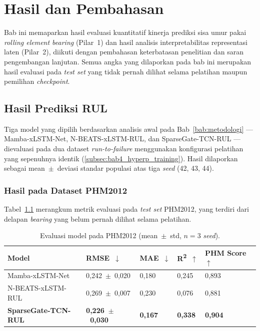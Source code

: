 ﻿%

\chapter{Hasil dan Pembahasan}
\label{bab:hasil-pembahasan}

Bab ini memaparkan hasil evaluasi kuantitatif kinerja prediksi sisa umur
pakai \emph{rolling element bearing} (Pilar~1) dan hasil analisis interpretabilitas
representasi laten (Pilar~2), diikuti dengan pembahasan keterbatasan
penelitian dan saran pengembangan lanjutan.
Semua angka yang dilaporkan pada bab ini merupakan hasil evaluasi pada
\emph{test set} yang tidak pernah dilihat selama pelatihan maupun
pemilihan \emph{checkpoint}.

\section{Hasil Prediksi RUL}
\label{sec:bab5_rul}

Tiga model yang dipilih berdasarkan analisis awal pada Bab~\ref{bab:metodologi}
--- Mamba-xLSTM-Net, N-BEATS-xLSTM-RUL, dan SparseGate-TCN-RUL ---
dievaluasi pada dua dataset \emph{run-to-failure} menggunakan konfigurasi
pelatihan yang sepenuhnya identik (\autoref{subsec:bab4_hyperp_training}).
Hasil dilaporkan sebagai mean~$\pm$~deviasi standar populasi atas tiga
\emph{seed} (42, 43, 44).

\subsection{Hasil pada Dataset PHM2012}
\label{subsec:bab5_phm2012}

Tabel~\ref{tab:bab5_phm2012} merangkum metrik evaluasi pada \emph{test set}
PHM2012, yang terdiri dari delapan \emph{bearing} yang belum pernah dilihat
selama pelatihan.

\begin{table}[ht]
\centering
\caption{Evaluasi model pada PHM2012 (mean~$\pm$~std, $n = 3$ \emph{seed}).}
\label{tab:bab5_phm2012}
\small
\begin{tabular}{@{}lllll@{}}
\toprule
\textbf{Model} & \textbf{RMSE~$\downarrow$} & \textbf{MAE~$\downarrow$}
  & \textbf{R\textsuperscript{2}~$\uparrow$} & \textbf{PHM Score~$\uparrow$} \\
\midrule
Mamba-xLSTM-Net            & 0{,}242~$\pm$~0{,}020 & 0{,}180 & 0{,}245 & 0{,}893 \\
N-BEATS-xLSTM-RUL          & 0{,}269~$\pm$~0{,}007 & 0{,}230 & 0{,}076 & 0{,}881 \\
\textbf{SparseGate-TCN-RUL} & \textbf{0{,}226~$\pm$~0{,}030}
  & \textbf{0{,}167} & \textbf{0{,}338} & \textbf{0{,}904} \\
\bottomrule
\end{tabular}
\end{table}


